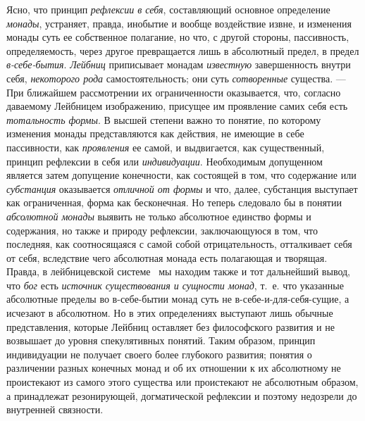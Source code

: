 Ясно, что принцип {\em рефлексии в себя}, составляющий
основное определение {\em монады}, устраняет, правда,
инобытие и вообще воздействие извне, и изменения монады суть ее собственное
полагание, но что, с другой стороны, пассивность, определяемость, через
другое превращается лишь в абсолютный предел, в предел
{\em в-себе-бытия}. {\em Лейбниц}
приписывает монадам {\em известную} завершенность
внутри себя, {\em некоторого рода} самостоятельность;
они суть {\em сотворенные} существа. — При ближайшем
рассмотрении их ограниченности оказывается, что, согласно даваемому
Лейбницем изображению, присущее им проявление самих себя есть
{\em тотальность формы}. В высшей степени важно то
понятие, по которому изменения монады представляются как действия, не
имеющие в себе пассивности, как {\em проявления} ее
самой, и выдвигается, как существенный, принцип рефлексии в себя или
{\em индивидуации}. Необходимым допущенном является
затем допущение конечности, как состоящей в том, что содержание или
{\em субстанция} оказывается
{\em отличной от формы} и что, далее, субстанция
выступает как ограниченная, форма как бесконечная. Но теперь следовало бы в
понятии {\em абсолютной монады} выявить не только
абсолютное единство формы и содержания, но также и природу рефлексии,
заключающуюся в том, что последняя, как соотносящаяся с самой собой
отрицательность, отталкивает себя от себя, вследствие чего абсолютная
монада есть полагающая и творящая. Правда, в лейбницевской системе \ мы
находим также и тот дальнейший вывод, что {\em бог}
есть {\em источник существования и сущности монад},
т.~е. что указанные абсолютные пределы во в-себе-бытии монад суть не
в-себе-и-для-себя-сущие, а исчезают в абсолютном. Но в этих определениях
выступают лишь обычные представления, которые Лейбниц оставляет без
философского развития и не возвышает до уровня спекулятивных понятий. Таким
образом, принцип индивидуации не получает своего более глубокого развития;
понятия о различении разных конечных монад и об их отношении к их
абсолютному не проистекают из самого этого существа или проистекают не
абсолютным образом, а принадлежат резонирующей, догматической рефлексии и
поэтому недозрели до внутренней связности.

